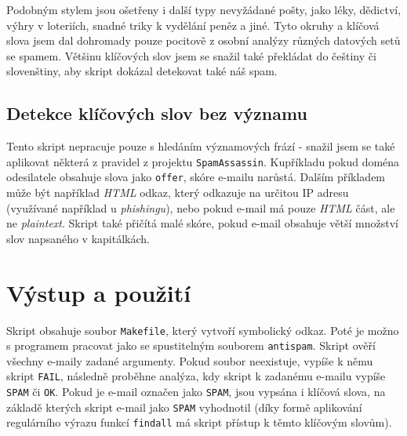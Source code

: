 \documentclass[12pt]{article}
\begin{document}
Podobným stylem jsou ošetřeny i další typy nevyžádané pošty, jako léky, dědictví, výhry v loteriích, snadné triky k vydělání peněz a jiné. Tyto okruhy a klíčová slova jsem dal dohromady pouze pocitově z osobní analýzy různých datových setů se spamem. Většinu klíčových slov jsem se snažil také překládat do češtiny či slovenštiny, aby skript dokázal detekovat také náš spam.

\newpage

\subsection{Detekce klíčových slov bez významu}

Tento skript nepracuje pouze s hledáním významových frází - snažil jsem se také aplikovat některá z pravidel z projektu \verb|SpamAssassin|. Kupříkladu pokud doména odesilatele obsahuje slova jako \verb|offer|, skóre e-mailu narůstá. Dalším příkladem může být například \textit{HTML} odkaz, který odkazuje na určitou IP adresu (využívané například u \textit{phishingu}), nebo pokud e-mail má pouze \textit{HTML} část, ale ne \textit{plaintext}. Skript také přičítá malé skóre, pokud e-mail obsahuje větší množství slov napsaného v kapitálkách. 

\section{Výstup a použití}

Skript obsahuje soubor \verb|Makefile|, který vytvoří symbolický odkaz. Poté je možno s programem pracovat jako se spustitelným souborem \verb|antispam|. Skript ověří všechny e-maily zadané argumenty. Pokud soubor neexistuje, vypíše k němu skript \verb|FAIL|, následně proběhne analýza, kdy skript k zadanému e-mailu vypíše \verb|SPAM| či \verb|OK|. Pokud je e-mail označen jako \verb|SPAM|, jsou vypsána i klíčová slova, na základě kterých skript e-mail jako \verb|SPAM| vyhodnotil (díky formě aplikování regulárního výrazu funkcí \verb|findall| má skript přístup k těmto klíčovým slovům).
\end{document}
